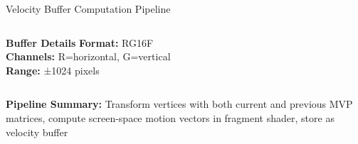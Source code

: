 \documentclass[aspectratio=169]{beamer}
\begin{document}
\begin{frame}[shrink=5]{Velocity Buffer Computation Pipeline}
\begin{columns}[t]
        \begin{column}{0.33\textwidth}
            \begin{block}{\textbf{Buffer Details}}
                {\scriptsize
                \textbf{Format:} RG16F\\[0.1cm]
                \textbf{Channels:} R=horizontal, G=vertical\\[0.1cm]
                \textbf{Range:} ±1024 pixels
                }
            \end{block}
        \end{column}
    \end{columns}
    
    \vspace{0.1cm}
    
    \begin{center}
        \colorbox{yellow!20}{\parbox{9cm}{\centering\small
            \textbf{Pipeline Summary:} Transform vertices with both current and previous MVP matrices, compute screen-space motion vectors in fragment shader, store as velocity buffer
        }}
    \end{center}
    
\end{frame}
\end{document}
